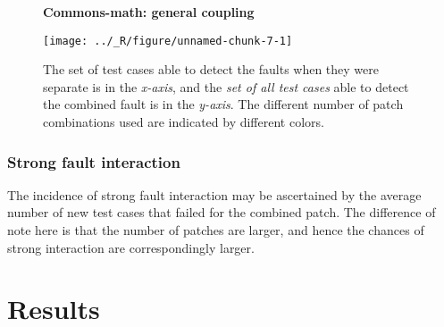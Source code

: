 \documentclass[preprint,nonatbib]{sigplanconf}\usepackage[]{graphicx}\usepackage[]{color}
\begin{document}
\begin{figure}[t]
\centering\textbf{Commons-math: general coupling}\par\medskip


{\centering \texttt{[image: ../\_R/figure/unnamed-chunk-7-1]} 

}


\caption{The set of test cases able to detect the faults when they were separate is in the \emph{x-axis},
  and the \emph{set of all test cases} able to detect the combined fault is in the \emph{y-axis}.
  The different number of patch combinations used are indicated by different colors.
}

\label{fig:mathfaults1}
\end{figure}

\subsubsection{Strong fault interaction}

The incidence of strong fault interaction may be ascertained by the average number of new test
cases that failed for the combined patch. The difference of note here is that the number of patches are larger, and hence the chances of strong interaction are correspondingly larger.


\section{Results}
\label{sec:results}
\end{document}
